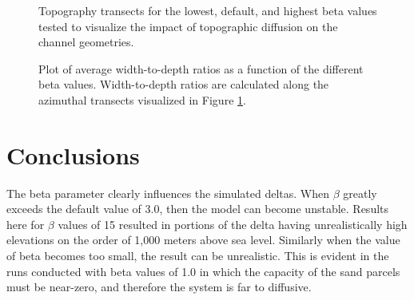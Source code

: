\begin{figure}
	\caption{Topography transects for the lowest, default, and highest beta values tested to visualize the impact of topographic diffusion on the channel geometries.}
	\label{fig:beta_transect}
\end{figure}

\begin{figure}[!ht]
	\caption{Plot of average width-to-depth ratios as a function of the different beta values. Width-to-depth ratios are calculated along the azimuthal transects visualized in Figure \ref{fig:beta_transect}.}
	\label{fig:beta_wd}
\end{figure}

\section{Conclusions}
The beta parameter clearly influences the simulated deltas.
When $\beta$ greatly exceeds the default value of 3.0, then the model can become unstable.
Results here for $\beta$ values of 15 resulted in portions of the delta having unrealistically high elevations on the order of 1,000 meters above sea level.
Similarly when the value of beta becomes too small, the result can be unrealistic.
This is evident in the runs conducted with beta values of 1.0 in which the capacity of the sand parcels must be near-zero, and therefore the system is far to diffusive.

\clearpage

